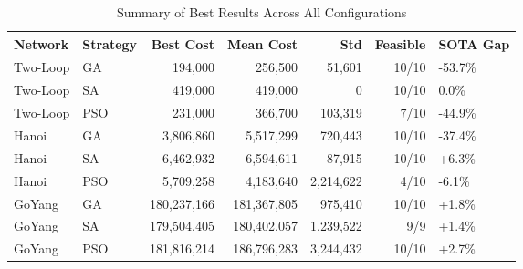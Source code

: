 \begin{table}[htbp]
\centering
\caption{Summary of Best Results Across All Configurations}
\label{tab:summary}
\begin{tabular}{llrrrrl}
\hline
Network & Strategy & Best Cost & Mean Cost & Std & Feasible & SOTA Gap \\
\hline
Two-Loop & GA & 194,000 & 256,500 & 51,601 & 10/10 & -53.7\% \\
Two-Loop & SA & 419,000 & 419,000 & 0 & 10/10 & 0.0\% \\
Two-Loop & PSO & 231,000 & 366,700 & 103,319 & 7/10 & -44.9\% \\
Hanoi & GA & 3,806,860 & 5,517,299 & 720,443 & 10/10 & -37.4\% \\
Hanoi & SA & 6,462,932 & 6,594,611 & 87,915 & 10/10 & +6.3\% \\
Hanoi & PSO & 5,709,258 & 4,183,640 & 2,214,622 & 4/10 & -6.1\% \\
GoYang & GA & 180,237,166 & 181,367,805 & 975,410 & 10/10 & +1.8\% \\
GoYang & SA & 179,504,405 & 180,402,057 & 1,239,522 & 9/9 & +1.4\% \\
GoYang & PSO & 181,816,214 & 186,796,283 & 3,244,432 & 10/10 & +2.7\% \\
\hline
\end{tabular}
\end{table}